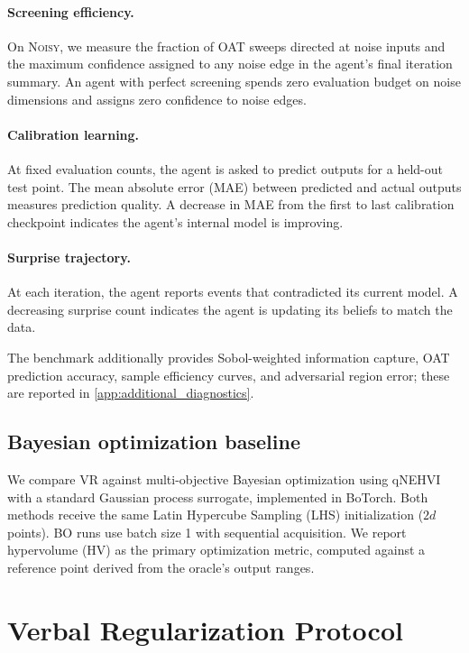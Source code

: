 \documentclass[11pt,letterpaper]{article}
\newcommand{\oracle}[1]{\textsc{#1}}
\newcommand{\noisy}{\oracle{Noisy}}
\begin{document}
\paragraph{Screening efficiency.} On \noisy{}, we measure the fraction
of OAT sweeps directed at noise inputs and the maximum confidence
assigned to any noise edge in the agent's final iteration summary. An
agent with perfect screening spends zero evaluation budget on noise
dimensions and assigns zero confidence to noise edges.

\paragraph{Calibration learning.} At fixed evaluation counts, the agent
is asked to predict outputs for a held-out test point. The mean absolute
error (MAE) between predicted and actual outputs measures prediction
quality. A decrease in MAE from the first to last calibration checkpoint
indicates the agent's internal model is improving.

\paragraph{Surprise trajectory.} At each iteration, the agent reports
events that contradicted its current model. A decreasing surprise count
indicates the agent is updating its beliefs to match the data.

The benchmark additionally provides Sobol-weighted information capture,
OAT prediction accuracy, sample efficiency curves, and adversarial
region error; these are reported in \cref{app:additional_diagnostics}.

\subsection{Bayesian optimization baseline}

We compare VR against multi-objective Bayesian optimization using
qNEHVI \cite{daulton2021nehvi} with a standard Gaussian process
surrogate, implemented in BoTorch. Both methods receive the same
Latin Hypercube Sampling (LHS) initialization ($2d$ points). BO runs
use batch size 1 with sequential acquisition. We report hypervolume
(HV) as the primary optimization metric, computed against a reference
point derived from the oracle's output ranges.

\section{Verbal Regularization Protocol}
\label{sec:protocol}
\end{document}
